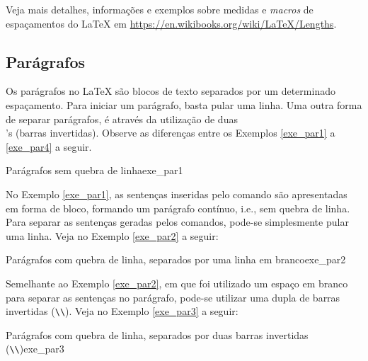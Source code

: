 \begin{marker}
Veja mais detalhes, informações e exemplos sobre medidas e \textit{macros} de espaçamentos do \LaTeX{} em \url{https://en.wikibooks.org/wiki/LaTeX/Lengths}.
\end{marker}

\subsection{Parágrafos}
\label{sec:paragrafos}

Os parágrafos no \LaTeX{} são blocos de texto separados por um determinado espaçamento. Para iniciar um parágrafo, basta pular uma linha. Uma outra forma de separar parágrafos, é através da utilização de duas \texttt{\\}'s (barras invertidas). Observe as diferenças entre os Exemplos \ref{exe_par1} a \ref{exe_par4} a seguir.

\begin{texexptitled}[breakable,enhanced,middle=2mm]{Parágrafos sem quebra de linha}{exe_par1}
\lipsumsentence[1-4] 
\lipsumsentence[5-8]
\end{texexptitled}

No Exemplo \ref{exe_par1}, as sentenças inseridas pelo comando \texttt{\lipsumsentence} são apresentadas em forma de bloco, formando um parágrafo contínuo, i.e., sem quebra de linha. Para separar as sentenças geradas pelos comandos, pode-se simplesmente pular uma linha. Veja no Exemplo \ref{exe_par2} a seguir:

\begin{texexptitled}[breakable,enhanced,middle=2mm]{Parágrafos com quebra de linha, separados por uma linha em branco}{exe_par2}
\lipsumsentence[9-12]  

\lipsumsentence[13-16]
\end{texexptitled}

Semelhante ao Exemplo \ref{exe_par2}, em que foi utilizado um espaço em branco para separar as sentenças no parágrafo, pode-se utilizar uma dupla de barras invertidas ({\tt \textbackslash\textbackslash}). Veja no Exemplo \ref{exe_par3} a seguir:

\begin{texexptitled}[breakable,enhanced,middle=2mm]{Parágrafos com quebra de linha, separados por duas barras invertidas ({\tt \textbackslash\textbackslash})}{exe_par3}
\lipsumsentence[17-20] \\ 
\lipsumsentence[21-24]
\end{texexptitled}

